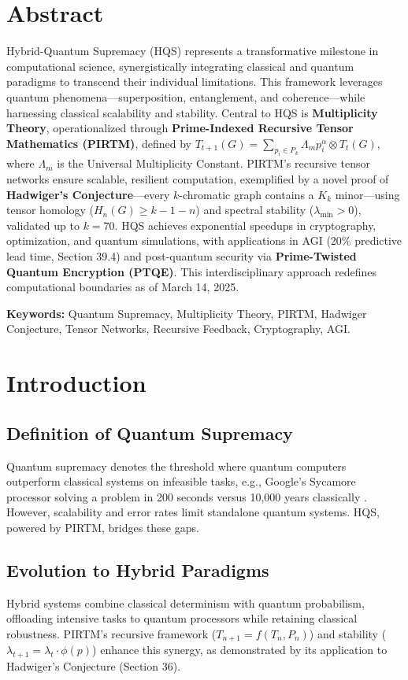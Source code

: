 \documentclass[12pt]{article}
\begin{document}
\section*{Abstract}
Hybrid-Quantum Supremacy (HQS) represents a transformative milestone in computational science, synergistically integrating classical and quantum paradigms to transcend their individual limitations. This framework leverages quantum phenomena—superposition, entanglement, and coherence—while harnessing classical scalability and stability. Central to HQS is \textbf{Multiplicity Theory}, operationalized through \textbf{Prime-Indexed Recursive Tensor Mathematics (PIRTM)}, defined by \( T_{t+1}(G) = \sum_{p_i \in P_k} \Lambda_m p_i^\alpha \otimes T_t(G) \), where \( \Lambda_m \) is the Universal Multiplicity Constant. PIRTM’s recursive tensor networks ensure scalable, resilient computation, exemplified by a novel proof of \textbf{Hadwiger’s Conjecture}—every $k$-chromatic graph contains a $K_k$ minor—using tensor homology (\( H_n(G) \geq k-1-n \)) and spectral stability (\( \lambda_{\min} > 0 \)), validated up to $k=70$. HQS achieves exponential speedups in cryptography, optimization, and quantum simulations, with applications in AGI (20\% predictive lead time, Section 39.4) and post-quantum security via \textbf{Prime-Twisted Quantum Encryption (PTQE)}. This interdisciplinary approach redefines computational boundaries as of March 14, 2025.

\textbf{Keywords:} Quantum Supremacy, Multiplicity Theory, PIRTM, Hadwiger Conjecture, Tensor Networks, Recursive Feedback, Cryptography, AGI.

\section{Introduction}
\subsection{Definition of Quantum Supremacy}
Quantum supremacy denotes the threshold where quantum computers outperform classical systems on infeasible tasks, e.g., Google’s Sycamore processor solving a problem in 200 seconds versus 10,000 years classically \cite{arute2019}. However, scalability and error rates limit standalone quantum systems. HQS, powered by PIRTM, bridges these gaps.

\subsection{Evolution to Hybrid Paradigms}
Hybrid systems combine classical determinism with quantum probabilism, offloading intensive tasks to quantum processors while retaining classical robustness. PIRTM’s recursive framework (\( T_{n+1} = f(T_n, P_n) \)) and stability (\( \lambda_{t+1} = \lambda_t \cdot \phi(p) \)) enhance this synergy, as demonstrated by its application to Hadwiger’s Conjecture (Section 36).
\end{document}
